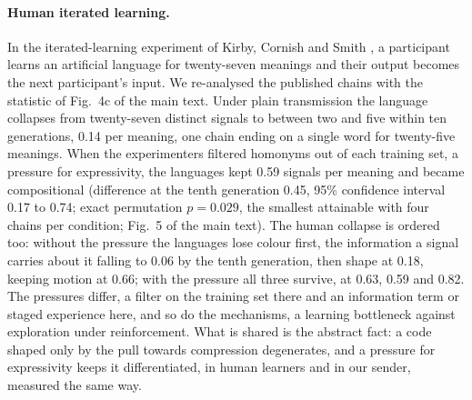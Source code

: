 \documentclass[11pt]{article}
\begin{document}
\paragraph{Human iterated learning.} In the iterated-learning experiment of Kirby, Cornish and Smith
\cite{kirby2008}, a participant learns an artificial language for twenty-seven meanings and their output becomes
the next participant's input. We re-analysed the published chains with the statistic of
Fig.~4c of the main text. Under plain transmission the language collapses from twenty-seven distinct signals to
between two and five within ten generations, 0.14 per meaning, one chain ending on a single word for twenty-five
meanings. When the experimenters filtered homonyms out of each training set, a pressure for expressivity, the
languages kept 0.59 signals per meaning and became compositional (difference at the tenth generation 0.45, 95\%
confidence interval 0.17 to 0.74; exact permutation $p = 0.029$, the smallest attainable with four chains per
condition; Fig.~5 of the main text). The human collapse is ordered too: without the pressure the languages lose
colour first, the information a signal carries about it falling to 0.06 by the tenth generation, then shape at
0.18, keeping motion at 0.66; with the pressure all three survive, at 0.63, 0.59 and 0.82. The pressures differ, a
filter on the training set there and an information term or staged experience here, and so do the mechanisms, a
learning bottleneck against exploration under reinforcement. What is shared is the abstract fact: a code shaped
only by the pull towards compression degenerates, and a pressure for expressivity keeps it differentiated, in
human learners and in our sender, measured the same way.
\end{document}
